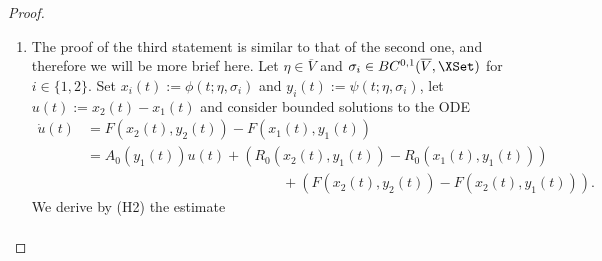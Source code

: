 \documentclass[a4paper]{siamart190516}
\begin{document}
\begin{proof}
\begin{enumerate}
Then by arguments similar to the proof of \cref{lem:bdd-sol-eqv}, we have
\begin{equation}\label{eq:bdd-sol-fast-estimate}
\begin{aligned}
u(t) &=  \int_{-\infty}^t T_0(t,s;\eta_1,\sigma)  \bigg( R_0(x_2(s),y_1(s)) - R_0(x_1(s),y_1(s))  \\
&\qquad \qquad \qquad \qquad \qquad +  F(x_2(s),y_2(s)) - F(x_2(s),y_1(s)) \bigg)  \, ds.
\end{aligned}
\end{equation}
We can now derive by using (H1) and (H2) the estimate
\begin{align*}
|u(t)| &\leq K \int_{-\infty}^t e^{-\mu(t-s)}  \big( | R_0(x_2(s),y_1(s)) - R_0(x_1(s),y_1(s))  | \\
&\qquad \qquad \qquad \qquad + | F(x_2(s),y_2(s)) - F(x_2(s),y_1(s)) | \big)  \, ds \\
&\leq K \int_{-\infty}^t e^{-\mu(t-s)} \left( M_1^x |u(s)| + M_1^y |y_2(s) - y_1(s)| \right)  \, ds.
\end{align*}
An application of \cref{lem:sol-slow-subsystem} gives for $t \in \RSet$:
\begin{align*}
e^{-N_1 (\delta+ 1) |t|} |u(t)| &\leq \frac{K M_1^x}{\mu-N_1(\delta +1)} \sup_{t \in \RSet} \left\{ e^{-N_1 (\delta+ 1) |t|} |u(t)|   \right\} \\
&\qquad \qquad +\frac{K M_1^y |\eta_2-\eta_1|}{\mu-N_1(\delta+1)}.
\end{align*}
As above inequality holds for all $t \in \RSet$, by reordering terms we obtain
\[
\sup_{t \in \RSet} \left\{ e^{-N_1 (\delta + 1) |t|} |x_2(t) - x_1(t)|   \right\} \leq \frac{K M_1^y |\eta_2 - \eta_1|}{\mu-K M_1^x-N_1(\delta +1)}.
\]
\item The proof of the third statement is similar to that of the second one, and therefore we will be more brief here. Let $\eta \in \overline{V}$ and $\sigma_i \in BC^{0,1}(\overline{V},\XSet)$ for $i \in \{1,2\}$. Set $x_i(t) := \phi(t;\eta,\sigma_i)$ and $y_i(t):= \psi(t;\eta,\sigma_i)$, let $u(t) := x_2(t) - x_1(t)$ and consider bounded solutions to the ODE
\begin{align*}
\dot{u}(t) &= F(x_2(t),y_2(t)) - F(x_1(t),y_1(t)) \\
&= A_0(y_1(t)) u(t) + (R_0(x_2(t),y_1(t)) - R_0(x_1(t),y_1(t)) ) \\
&\qquad \qquad \qquad \qquad \qquad \qquad \qquad +  (F(x_2(t),y_2(t)) - F(x_2(t),y_1(t)) ). 
\end{align*}
We derive by (H2) the estimate 
\begin{align*}

\end{align*}
\end{enumerate}
\end{proof}
\end{document}
